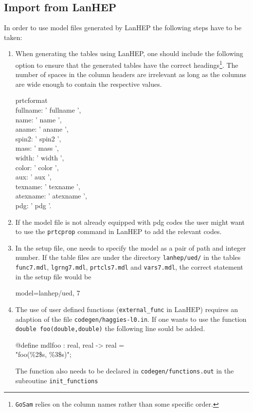 \documentclass[11pt,a4paper]{refrep}
\newcommand{\golemversion}{{1{.}0}}
\newcommand{\golemv}[1][\golemversion]{{\tt GoSam}\xspace}
\begin{document}
\subsection{Import from LanHEP}
In order to use model files generated by LanHEP the following steps
have to be taken:
\begin{enumerate}
\item When generating the tables using LanHEP, one should include the
   following option to ensure that the generated tables have the correct
   headings\footnote{\golemv{} relies on the column names rather than
   some specific order.}. The number of spaces in the column headers are
   irrelevant as long as the columns are wide enough to contain the
   respective values.
\begin{example}
   prtcformat\\
      fullname: '  fullname  ',\\
      name:     '  name   ',\\
      aname:    '  aname  ',\\
      spin2:    '  spin2  ',\\
      mass:     '  mass  ',\\
      width:    '  width  ',\\
      color:    '  color  ',\\
      aux:      '  aux  ',\\
      texname:  '      texname      ',\\
      atexname: '     atexname      ',\\
      pdg:      '  pdg   '.
\end{example}
\item If the model file is not already equipped with pdg codes
   the user might want to use the \verb!prtcprop! command in
   LanHEP to add the relevant codes.
\item In the setup file, one needs to specify the model as a pair
   of path and integer number. If the table files are under the directory
   \texttt{lanhep/ued/} in the tables \texttt{func7.mdl}, \texttt{lgrng7.mdl},
   \texttt{prtcls7.mdl} and \texttt{vars7.mdl}, the correct statement in
   the setup file would be
\begin{example}
   model=lanhep/ued, 7
\end{example}
\item The use of user defined functions (\texttt{external\_func} in LanHEP)
   requires an adaption of the file \texttt{codegen/haggies-l0.in}. If one
   wants to use the function \texttt{double foo(double,double)} the
   following line sould be added.
\begin{example}
@define mdlfoo : real, real -> real =\\ "foo(\%2\$s, \%3\$s)";
\end{example}
   The function also needs to be declared in \texttt{codegen/functions.out}
   in the subroutine \texttt{init\_functions}
\end{enumerate}
\end{document}
